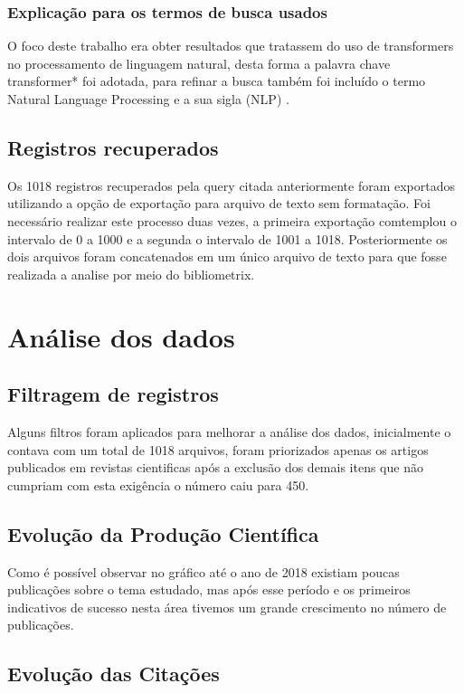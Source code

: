 \subsubsection{Explicação para os termos de busca usados}
O foco deste trabalho era obter resultados que tratassem do uso de transformers no processamento de linguagem natural, desta forma a palavra chave transformer* foi adotada, para refinar a busca também foi incluído o termo Natural Language Processing e a sua sigla (NLP) .

\subsection{Registros recuperados}
Os 1018 registros recuperados pela query citada anteriormente foram exportados utilizando a opção de exportação para arquivo de texto sem formatação. Foi necessário realizar este processo duas vezes, a primeira exportação comtemplou o intervalo de 0 a 1000 e a segunda o intervalo de 1001 a 1018. Posteriormente os dois arquivos foram concatenados em um único arquivo de texto para que fosse realizada a analise por meio do bibliometrix. 

\section{Análise dos dados}

\subsection{Filtragem de registros}
Alguns filtros foram aplicados para melhorar a análise dos dados, inicialmente o \dataset contava com um total de 1018 arquivos, foram priorizados apenas os artigos publicados em revistas cientificas após a exclusão dos demais itens que não cumpriam com esta exigência o número caiu para 450. 

\subsection{Evolução da Produção Científica}

Como é possível observar no gráfico até o ano de 2018 existiam poucas publicações sobre o tema estudado, mas após esse período e os primeiros indicativos de sucesso nesta área tivemos um grande crescimento no número de publicações.

\subsection{Evolução das Citações}

